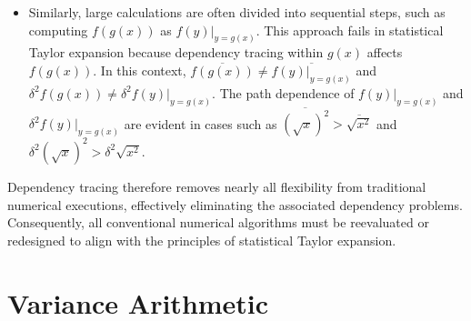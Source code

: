 \documentclass[twoside]{article}
\numberwithin{equation}{section}
\newcommand{\Verbose}{}
\begin{document}
\begin{itemize}
\item
Similarly, large calculations are often divided into sequential steps, such as computing $f(g(x))$ as $f(y)|_{y = g(x)}$.
This approach fails in statistical Taylor expansion because dependency tracing within $g(x)$ affects $f(g(x))$.
In this context, $\overline{f(g(x))} \neq \overline{f(y)|_{y = g(x)}}$ and $\delta^2 f(g(x)) \neq \delta^2 f(y)|_{y = g(x)}$.
The path dependence of $f(y)|_{y = g(x)}$ and $\delta^2 f(y)|_{y = g(x)}$ are evident in cases such as $\overline{(\sqrt{x})^2} > \overline{\sqrt{x^2}}$ and $\delta^2 (\sqrt{x})^2 > \delta^2 \sqrt{x^2}$.

\end{itemize}

Dependency tracing therefore removes nearly all flexibility from traditional numerical executions, effectively eliminating the associated dependency problems.
Consequently, all conventional numerical algorithms must be reevaluated or redesigned to align with the principles of statistical Taylor expansion.








\ifdefined\Verbose
\clearpage
\fi
\section{Variance Arithmetic}
\label{sec: variance arithmetic}
\end{document}
